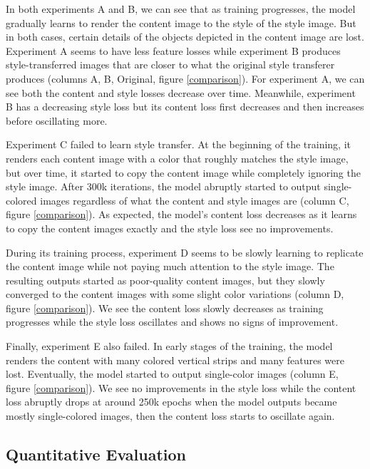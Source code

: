 \documentclass{article}
\begin{document}
In both experiments A and B, we can see that as training progresses, the model gradually learns to render the content image to the style of the style image. But in both cases, certain details of the objects depicted in the content image are lost. Experiment A seems to have less feature losses while experiment B produces style-transferred images that are closer to what the original style transferer produces (columns A, B, Original, figure \ref{comparison}). For experiment A, we can see both the content and style losses decrease over time. Meanwhile, experiment B has a decreasing style loss but its content loss first decreases and then increases before oscillating more.

Experiment C failed to learn style transfer. At the beginning of the training, it renders each content image with a color that roughly matches the style image, but over time, it started to copy the content image while completely ignoring the style image. After 300k iterations, the model abruptly started to output single-colored images regardless of what the content and style images are (column C, figure \ref{comparison}). As expected, the model's content loss decreases as it learns to copy the content images exactly and the style loss see no improvements.

During its training process, experiment D seems to be slowly learning to replicate the content image while not paying much attention to the style image. The resulting outputs started as poor-quality content images, but they slowly converged to the content images with some slight color variations (column D, figure \ref{comparison}). We see the content loss slowly decreases as training progresses while the style loss oscillates and shows no signs of improvement.

Finally, experiment E also failed. In early stages of the training, the model renders the content with many colored vertical strips and many features were lost. Eventually, the model started to output single-color images (column E, figure \ref{comparison}). We see no improvements in the style loss while the content loss abruptly drops at around 250k epochs when the model outputs became mostly single-colored images, then the content loss starts to oscillate again.

\subsection{Quantitative Evaluation}
\end{document}
